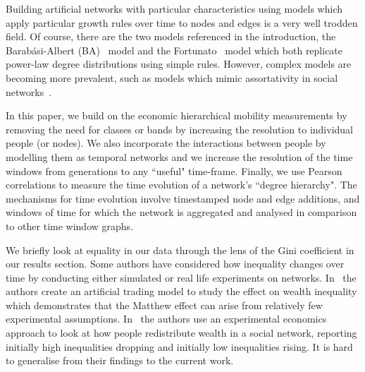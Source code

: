 Building artificial networks with particular characteristics using models which apply particular growth rules over time to nodes and edges is a very well trodden field. Of course, there are the two models referenced in the introduction, the Barab\'{a}si-Albert (BA)~\cite{Barabasi1999EmergenceNetworks} model and the Fortunato~\cite{Fortunato2006Scale-freeRanking} model which both replicate power-law degree distributions using simple rules. However, complex models are becoming more prevalent, such as models which mimic assortativity in social networks~\cite{Zhou2020UniversalNetworks}.

In this paper, we build on the economic hierarchical mobility measurements by removing the need for classes or bands by increasing the resolution to individual people (or nodes). We also incorporate the interactions between people by modelling them as temporal networks and we increase the resolution of the time windows from generations to any ``useful" time-frame. Finally, we use Pearson correlations to measure the time evolution of a network's ``degree hierarchy". The mechanisms for time evolution involve timestamped node and edge additions, and windows of time for which the network is aggregated and analysed in comparison to other time window graphs.

We briefly look at equality in our data through the lens of the Gini coefficient in our results section. Some authors have considered how inequality changes over time by conducting either simulated or real life experiments on networks. In~\cite{cui2023kinetic} the authors create an artificial trading model to study the effect on wealth inequality which demonstrates that the Matthew effect can arise from relatively few experimental assumptions. 
In~\cite{nishi2015inequality} the authors use an experimental economics approach to look at how people redistribute wealth in a social network, reporting initially high inequalities dropping and initially low inequalities rising. It is hard to generalise from their findings to the current work.